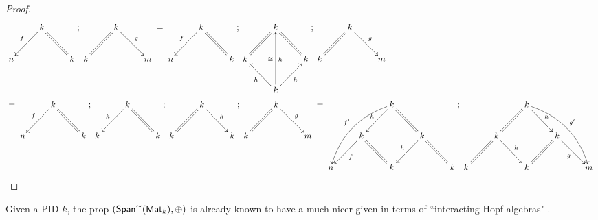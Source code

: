 \begin{proof}
{
\xymatrixrowsep{0mm}\xymatrixcolsep{1.7mm}
\begin{align*}
&
\xymatrix{
   & k \ar[dl]_f \ar@{=}[dr]\\
n &                                      &k
};
\xymatrix{
   & k \ar[dr]^g \ar@{=}[dl]\\
k &                                      &m
}
 =
\xymatrix{
   & k \ar[dl]_f \ar@{=}[dr]\\
n &                                      &k
};
\xymatrix{
   & k \ar@{=}[dl] \ar@{=}[dr]\\
k &                                             & k\\
   & k \ar[ul]^h \ar[ur]_h \ar[uu]^\cong_h
};
\xymatrix{
   & k \ar[dr]^g \ar@{=}[dl]\\
k &                                      &m
}\\
 &=
\xymatrix{
   & k \ar[dl]_f \ar@{=}[dr]\\
n &                                      &k
};
\xymatrix{
   & k \ar[dl]_h \ar@{=}[dr]\\
k &                                         & k
};
\xymatrix{
   & k \ar[dr]^h \ar@{=}[dl]\\
k &                                         & k
};
\xymatrix{
   & k \ar[dr]^g \ar@{=}[dl]\\
k &                                      &m
}
=
\xymatrix{
            &                                                        &k \ar[dl]_{h} \ar@{=}[dr] \ar@/_1.2pc/[ddll]_{f'}\\
            & k \ar@{=}[dr] \ar[dl]^{f}&                                                          & k \ar@{=}[dr] \ar[dl]_{h}\\
n &                                                         & k                                             &                                                         &k
};
\xymatrix{
            &                                                        & k \ar[dr]^{h} \ar@{=}[dl] \ar@/^1.2pc/[ddrr]^{g'}  \\
            & k \ar[dr]^{h}   \ar@{=}[dl] &                                                          & k \ar@{=}[dl] \ar[dr]_{g}\\
k &                                                         & k                                             &                                                         &m
}
\end{align*}
}
\end{proof}
Given a PID $k$, the prop $(\mathsf{Span}^\sim(\mathsf{Mat}_k), \oplus)$ is already known to have a much nicer given in terms of ``interacting Hopf algebras" \cite[Definition 3.13]{ih}. 
